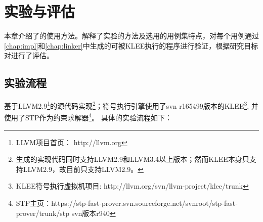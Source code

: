 \chapter{实验与评估}
\label{chap:eval}

本章介绍了\dryrun 的使用方法。解释了实验的方法及选用的用例集特点，对每个用例通过\autoref{chap:impl}和\autoref{chap:linker}中生成的可被KLEE执行的程序进行验证，根据研究目标对\dryrun 进行了评估。

\section{实验流程}
\label{sec:impl_process}

\dryrun 基于LLVM2.9\footnote{LLVM项目首页： http://llvm.org}的源代码实现\footnote{生成\rbscope 的实现代码同时支持LLVM2.9和LLVM3.4以上版本；然而KLEE本身只支持LLVM2.9，故\dryrun 目前只支持LLVM2.9。}；符号执行引擎使用了svn r165499版本的KLEE\footnote{KLEE符号执行虚拟机项目: http://llvm.org/svn/llvm-project/klee/trunk}, 并使用了STP作为约束求解器\footnote{STP主页：https://stp-fast-prover.svn.sourceforge.net/svnroot/stp-fast-prover/trunk/stp svn版本r940}。
具体的实验流程如下：
